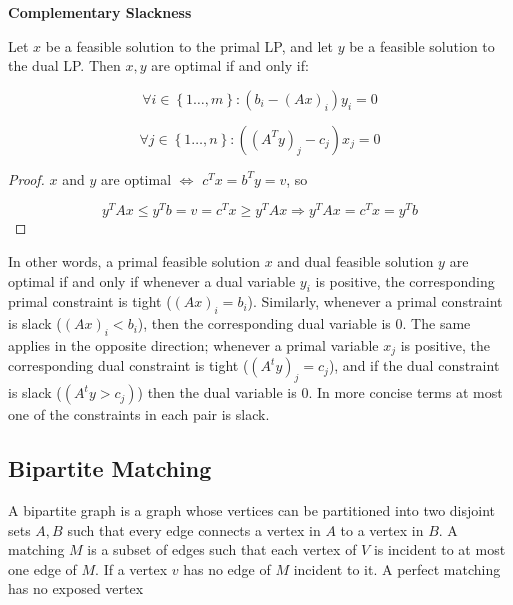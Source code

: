 \documentclass[../notes.tex]{subfiles}
\begin{document}


\begin{theorem}
    \textbf{Complementary Slackness}

    Let $ x $ be a feasible solution to the primal LP, and let $ y $ be a feasible solution to the dual LP. Then $ x, y $ are optimal if and only if:

    \begin{equation}
        \forall i \in \left\{  1 \ldots,  m \right\} : (b_i - (Ax)_i)y_i = 0
    \end{equation}

    \begin{equation}
        \forall j \in \left\{  1 \ldots,  n \right\} : ((A^Ty)_j - c_j)x_j = 0
    \end{equation}

    \begin{proof}
        $ x $ and $ y $ are optimal $ \iff $ $ c^Tx = b^Ty = v $, so

        \begin{equation}
            y^T Ax \le  y^T b = v = c^Tx \ge  y^T Ax \Rightarrow y^T Ax = c^Tx = y^T b
        \end{equation}


    \end{proof}
    
    In other words, a primal feasible solution $ x $ and dual feasible solution $ y $ are optimal if and only if whenever a dual variable $ y_i $ is positive, the corresponding primal constraint is tight ($ (Ax)_i = b_i$). Similarly, whenever a primal constraint is slack ($ (Ax)_i < b_i $), then the corresponding dual variable is 0. The same applies in the opposite direction; whenever a primal variable $ x_j $ is positive, the corresponding dual constraint is tight ($ (A^ty)_j = c_j $), and if the dual constraint is slack ($ (A^ty > c_j) $) then the dual variable is $ 0 $. In more concise terms at most one of the constraints in each pair is slack.

    
    



\end{theorem}


\subsection{Bipartite Matching}

A bipartite graph is a graph whose vertices can be partitioned into two disjoint sets $ A, B $ such that every edge connects a vertex in $ A $ to a vertex in $ B $. A matching $ M $ is a subset of edges such that each vertex of $ V $ is incident to at most one edge of $ M $. If a vertex $ v $ has no edge of $ M $ incident to it. A perfect matching has no exposed vertex
\end{document}
